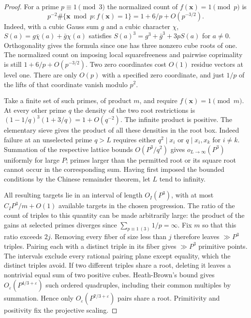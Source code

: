 \documentclass[11pt,letterpaper]{article}
\theoremstyle{definition}
\begin{document}
\begin{proof}
For a prime $p\equiv1\pmod3$ the normalized count of
$f(\mathbf x)=1\pmod p$ is
\[
 p^{-2}\#\{\mathbf x\bmod p:f(\mathbf x)=1\}
                    =1+6/p+O(p^{-3/2}).
\]
Indeed, with a cubic Gauss sum $g$ and a cubic character $\chi$,
$S(a)=g\bar\chi(a)+\bar g\chi(a)$ satisfies
$S(a)^3=g^3+\bar g^3+3pS(a)$ for $a\ne0$.
Orthogonality gives the formula since one has three nonzero cube
roots of one. The normalized count on imposing local squarefreeness
and pairwise coprimality is still $1+6/p+O(p^{-3/2})$.
Two zero coordinates cost $O(1)$ residue vectors at level one.
There are only $O(p)$ with a specified zero coordinate, and just
$1/p$ of the lifts of that coordinate vanish modulo $p^2$.

Take a finite set of such primes, of product $m$, and require
$f(\mathbf x)=1\pmod m$. At every other prime $q$ the density of
the two root restrictions is
$(1-1/q)^3(1+3/q)=1+O(q^{-2})$. The infinite product is positive.
The elementary sieve gives the product of all these densities in
the root box. Indeed failure at an unselected prime $q>L$ requires
either $q^2\mid x_i$ or $q\mid x_i,x_k$ for $i\ne k$.
Summation of the respective lattice bounds
$O(P^3/q^2)$ gives $o_{L\to\infty}(P^3)$ uniformly for large $P$;
primes larger than the permitted root or its square root cannot
occur in the corresponding sum. Having first imposed the bounded
conditions by the Chinese remainder theorem, let $L$ tend to infinity.

All resulting targets lie in an interval of length $O_I(P^3)$, with
at most $C_I P^3/m+O(1)$ available targets in the chosen progression.
The ratio of the count of triples to this quantity can be made
arbitrarily large: the product of the gains at selected primes
diverges since $\sum_{p\equiv1\ (3)}1/p=\infty$. Fix $m$ so that
this ratio exceeds $2j$. Removing every fiber of size less than $j$
therefore leaves $\gg P^3$ triples. Pairing each with a distinct
triple in its fiber gives $\gg P^3$ primitive points. The intervals
exclude every rational pairing plane except equality, which the
distinct triples avoid. If two different triples share a root,
deleting it leaves a nontrivial equal sum of two positive cubes.
Heath-Brown's bound \cite{c3:hbcubicsurface} gives
$O_\varepsilon(P^{4/3+\varepsilon})$ such ordered quadruples,
including their common multiples by summation. Hence only
$O_\varepsilon(P^{7/3+\varepsilon})$ pairs share a root.
Primitivity and positivity fix the projective scaling.
\end{proof}
\end{document}
